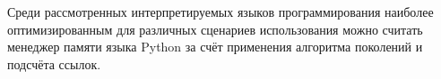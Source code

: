 
Среди рассмотренных интерпретируемых языков программирования наиболее оптимизированным для различных сценариев использования можно считать менеджер памяти языка Python за счёт применения алгоритма поколений и подсчёта ссылок.

